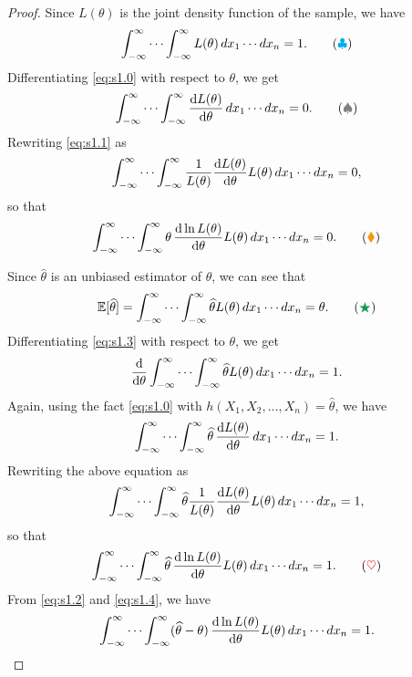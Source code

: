\begin{proof}
    Since $L(\theta)$ is the joint density function of the sample, we have
    \[
        \int_{-\infty}^{\infty} \cdots \int_{-\infty}^{\infty} L(\theta) \, dx_1 \cdots dx_n = 1. \label{eq:s1.0} \tag{{\color{cyan} $\clubsuit$}}
    \]
    Differentiating \eqref{eq:s1.0} with respect to $\theta$, we get
    \[
        \int_{-\infty}^{\infty} \cdots \int_{-\infty}^{\infty} \odv{L(\theta)}{\theta} \, dx_1 \cdots dx_n = 0. \label{eq:s1.1} \tag{{\color{gray} $\spadesuit$}}
    \]
    Rewriting \eqref{eq:s1.1} as 
    \[
        \int_{-\infty}^{\infty} \cdots \int_{-\infty}^{\infty} \frac{1}{L(\theta)} \odv{L(\theta)}{\theta} L(\theta) \, dx_1 \cdots dx_n = 0,
    \]
    so that 
    \[
        \int_{-\infty}^{\infty} \cdots \int_{-\infty}^{\infty} \theta \, \odv{\ln L(\theta)}{\theta} L(\theta) \, dx_1 \cdots dx_n = 0. \label{eq:s1.2} \tag{{\color{YellowOrange} $\blacklozenge$}}
    \]

    Since $\widehat{\theta}$ is an unbiased estimator of $\theta$, we can see that 
    \[
        \mathbb{E}[\widehat{\theta}] = \int_{-\infty}^{\infty} \cdots \int_{-\infty}^{\infty} \widehat{\theta} L(\theta) \, dx_1 \cdots dx_n = \theta. \label{eq:s1.3} \tag{{\color{ForestGreen} $\bigstar $}}
    \]
    Differentiating \eqref{eq:s1.3} with respect to $\theta$, we get
    \[
        \odv{}{\theta} \int_{-\infty}^{\infty} \cdots \int_{-\infty}^{\infty} \widehat{\theta} L(\theta) \, dx_1 \cdots dx_n = 1.
    \]
    Again, using the fact \eqref{eq:s1.0} with $h(X_1, X_2, \ldots, X_n) = \widehat{\theta}$, we have
    \[
        \int_{-\infty}^{\infty} \cdots \int_{-\infty}^{\infty} \widehat{\theta}\, \odv{L(\theta)}{\theta} \, dx_1 \cdots dx_n = 1.
    \]
    Rewriting the above equation as
    \[
        \int_{-\infty}^{\infty} \cdots \int_{-\infty}^{\infty} \widehat{\theta} \frac{1}{L(\theta)} \odv{L(\theta)}{\theta} L(\theta) \, dx_1 \cdots dx_n = 1,
    \]
    so that
    \[
        \int_{-\infty}^{\infty} \cdots \int_{-\infty}^{\infty} \widehat{\theta} \, \odv{\ln L(\theta)}{\theta} L(\theta) \, dx_1 \cdots dx_n = 1. \label{eq:s1.4} \tag{{\color{Red} $\heartsuit $}}
    \]
    From \eqref{eq:s1.2} and \eqref{eq:s1.4}, we have
    \[
        \int_{-\infty}^{\infty} \cdots \int_{-\infty}^{\infty} (\widehat{\theta} - \theta) \, \odv{\ln L(\theta)}{\theta} L(\theta) \, dx_1 \cdots dx_n = 1.
    \]


\end{proof}

